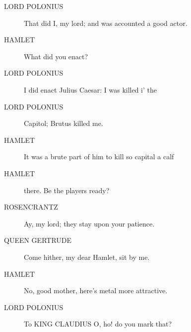 \documentclass{article}
\begin{document}
\begin{description}
            
\item[LORD POLONIUS] That did I, my lord; and was accounted a good actor.
\end{description}
          
\begin{description}
            
\item[HAMLET] What did you enact?
\end{description}
          
\begin{description}
            
\item[LORD POLONIUS] I did enact Julius Caesar: I was killed i' the
\item[LORD POLONIUS] Capitol; Brutus killed me.
\end{description}
          
\begin{description}
            
\item[HAMLET] It was a brute part of him to kill so capital a calf
\item[HAMLET] there. Be the players ready?
\end{description}
          
\begin{description}
            
\item[ROSENCRANTZ] Ay, my lord; they stay upon your patience.
\end{description}
          
\begin{description}
            
\item[QUEEN GERTRUDE] Come hither, my dear Hamlet, sit by me.
\end{description}
          
\begin{description}
            
\item[HAMLET] No, good mother, here's metal more attractive.
\end{description}
          
\begin{description}
            
\item[LORD POLONIUS] 
               To KING CLAUDIUS  O, ho! do you mark that?
\end{description}
          
\end{document}
